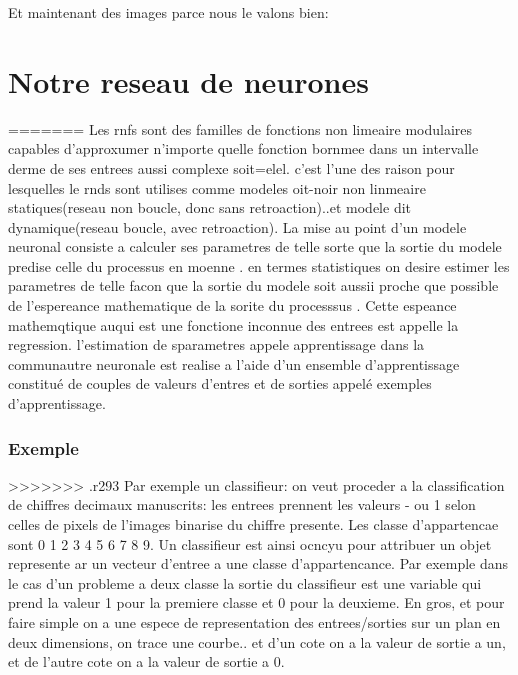 Et maintenant des images parce nous le valons bien:




\chapter{Notre reseau de neurones} %
\label{cha:notre_reseau_de_neurones}
=======
Les rnfs sont des familles de fonctions non limeaire modulaires
capables d'approxumer n'importe quelle fonction bornmee dans un
intervalle derme de ses entrees aussi complexe soit=elel. c'est l'une
des raison pour lesquelles le rnds sont utilises comme modeles
oit-noir non linmeaire statiques(reseau non boucle, donc sans
retroaction)..et modele dit dynamique(reseau boucle, avec
retroaction). La mise au point d'un modele neuronal consiste a
calculer ses parametres de telle sorte que la sortie du modele predise
celle du processus en moenne . en termes statistiques on desire
estimer les parametres de telle facon que la sortie du modele soit
aussii proche que possible de l'espereance mathematique de la sorite
du processsus . Cette espeance mathemqtique auqui est une fonctione
inconnue des entrees est appelle la regression. l'estimation de
sparametres appele apprentissage dans la communautre neuronale est
realise  a l'aide d'un ensemble d'apprentissage constitu\'e de couples
de valeurs d'entres et de sorties appel\'e exemples d'apprentissage.

\subsection{Exemple}
>>>>>>> .r293
Par exemple un classifieur: on veut proceder a la classification de
chiffres decimaux manuscrits: les entrees prennent les valeurs - ou 1
selon celles de pixels de l'images binarise du chiffre presente. Les
classe d'appartencae sont {0 1 2 3 4 5 6 7 8 9}.
Un classifieur est ainsi ocncyu pour attribuer un objet represente ar
un vecteur d'entree a une classe d'appartencance. Par exemple dans le
cas d'un probleme a deux classe la sortie du classifieur est une
variable qui prend la valeur 1 pour la premiere classe et 0 pour la
deuxieme.
En gros, et pour faire simple on a une espece de representation des
entrees/sorties sur un plan en deux dimensions, on trace une
courbe.. et d'un cote on a la valeur de sortie a un, et de l'autre
cote on a la valeur de sortie a 0.

